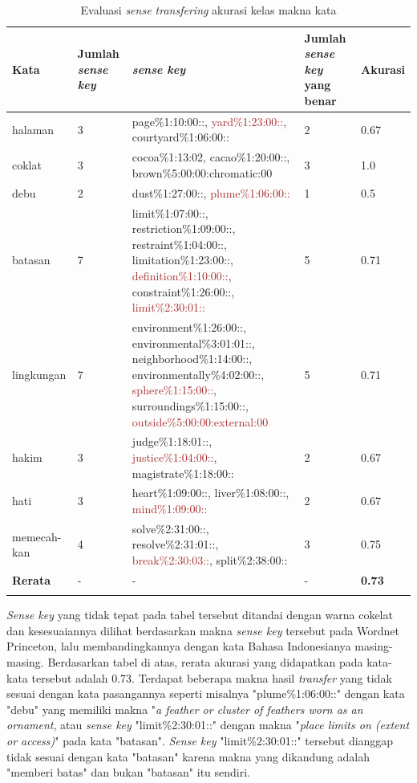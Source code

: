 \begin{longtable}{|p{1.8cm}|p{1.2cm}|p{5cm}|p{1.2cm}|p{1.5cm}|} 
	\hline
	\textbf{Kata} & \textbf{Jumlah \textit{sense key}} & \textbf{\textit{sense key}}  & \textbf{Jumlah \textit{sense key} yang benar} & \textbf{Akurasi} \\ \hline
	halaman & 3 &  page\%1:10:00::, \textcolor{brown}{yard\%1:23:00::}, courtyard\%1:06:00:: & 2 & 0.67 \\ \hline
	coklat & 3 & cocoa\%1:13:02, cacao\%1:20:00::, brown\%5:00:00:chromatic:00 & 3 & 1.0 \\ \hline
	debu & 2 & dust\%1:27:00::, \textcolor{brown}{plume\%1:06:00::} & 1 & 0.5 \\ \hline
	batasan & 7 & limit\%1:07:00::, restriction\%1:09:00::, restraint\%1:04:00::, limitation\%1:23:00::, \textcolor{brown}{definition\%1:10:00::}, constraint\%1:26:00::, \textcolor{brown}{limit\%2:30:01::} & 5 & 0.71 \\ \hline
	lingkungan & 7 & environment\%1:26:00::, environmental\%3:01:01::, neighborhood\%1:14:00::, environmentally\%4:02:00::, \textcolor{brown}{sphere\%1:15:00::}, surroundings\%1:15:00::, \textcolor{brown}{outside\%5:00:00:external:00} & 5 & 0.71 \\ \hline
	hakim & 3 & judge\%1:18:01::, \textcolor{brown}{justice\%1:04:00::}, magistrate\%1:18:00:: & 2 & 0.67 \\ \hline
	hati & 3 & heart\%1:09:00::, liver\%1:08:00::, \textcolor{brown}{mind\%1:09:00::} & 2 & 0.67 \\ \hline
	memecah-kan & 4 & solve\%2:31:00::, resolve\%2:31:01::, \textcolor{brown}{break\%2:30:03::}, split\%2:38:00:: & 3 & 0.75 \\ \hline
	\hline
	\textbf{Rerata} & - & - & - & \textbf{0.73} \\ \hline
	\caption{Evaluasi \textit{sense transfering} akurasi kelas makna kata}
	\label{table:akuras-kelas-makna-kata}
\end{longtable}
 
\textit{Sense key} yang tidak tepat pada tabel tersebut ditandai dengan warna cokelat dan kesesuaiannya dilihat berdasarkan makna \textit{sense key} tersebut pada Wordnet Princeton, lalu membandingkannya dengan kata Bahasa Indonesianya masing-masing.
Berdasarkan tabel di atas, rerata akurasi yang didapatkan pada kata-kata tersebut adalah 0.73. Terdapat beberapa makna hasil \textit{transfer} yang tidak sesuai dengan kata pasangannya seperti misalnya "plume\%1:06:00::" dengan kata "debu" yang memiliki makna "\textit{a feather or cluster of feathers worn as an ornament}, atau \textit{sense key} "limit\%2:30:01::" dengan makna "\textit{place limits on (extent or access)}" pada kata "batasan". \textit{Sense key} "limit\%2:30:01::" tersebut dianggap tidak sesuai dengan kata "batasan" karena makna yang dikandung adalah "memberi batas" dan bukan "batasan" itu sendiri.

